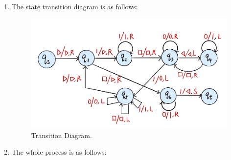 \documentclass[12pt,a4paper]{article}
\theoremstyle{definition}
\begin{document}
\begin{enumerate}
\begin{enumerate}
			\item The state transition diagram is as follows:
			
			\begin{figure}[!htbp]
				\centering
				\includegraphics[scale= 0.8]{1.png}
				\caption{Transition Diagram.} \label{Fig-Conflict}
			\end{figure}
			
			\item The whole process is as follows:
			

\end{enumerate}
\end{enumerate}
\end{document}
